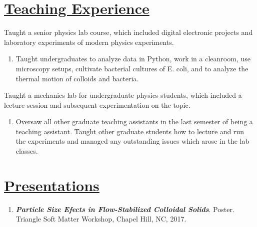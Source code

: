 \documentclass[]{deedy-resume-openfont}
\begin{document}
\begin{minipage}[t]{.90\textwidth}


\section{\underline{Teaching Experience}}

Taught a senior physics lab course, which included digital electronic projects and laboratory experiments of modern physics experiments.

\begin{enumerate}[label=\textbullet,leftmargin = !,labelindent = -15pt, itemindent = 0pt, noitemsep, topsep = 0pt]

\item Taught undergraduates to analyze data in Python, work in a cleanroom, use microscopy setups, cultivate bacterial cultures of E. coli, and to analyze the thermal motion of colloids and bacteria.

\vspace{5pt}

\end{enumerate}

Taught a mechanics lab for undergraduate physics students, which included a lecture session and subsequent experimentation on the topic.

\begin{enumerate}[label=\textbullet,leftmargin = !,labelindent = -15pt, itemindent = 0pt, noitemsep, topsep = 0pt]

\item Oversaw all other graduate teaching assistants in the last semester of being a teaching assistant. Taught other graduate students how to lecture and run the experiments and managed any outstanding issues which arose in the lab classes.

\end{enumerate}


\section{\underline{Presentations}}
\runsubsection{}
\begin{flushleft}
\begin{enumerate}
\item\textbf{\textit{Particle Size Efects in Flow-Stabilized Colloidal Solids}}. Poster. Triangle Soft Matter Workshop, Chapel Hill, NC, 2017.


\end{enumerate}
\end{flushleft}
\end{minipage}
\end{document}
